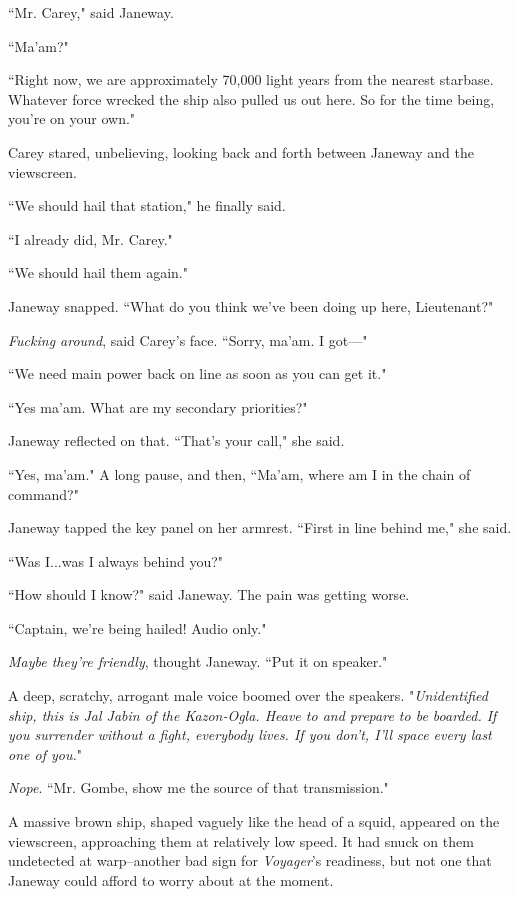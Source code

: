 \documentclass[twoside,letterpaper,12pt]{memoir}
\begin{document}
``Mr. Carey," said Janeway.

``Ma'am?"

``Right now, we are approximately 70,000 light years from the nearest starbase. Whatever force wrecked the ship also pulled us out here. So for the time being, you're on your own."

Carey stared, unbelieving, looking back and forth between Janeway and the viewscreen.

``We should hail that station," he finally said.

``I already did, Mr. Carey."

``We should hail them again."

Janeway snapped. ``What do you think we've been doing up here, Lieutenant?"

\textit{Fucking around}, said Carey's face. ``Sorry, ma'am. I got---"

``We need main power back on line as soon as you can get it."

``Yes ma'am. What are my secondary priorities?"

Janeway reflected on that. ``That's your call," she said.

``Yes, ma'am." A long pause, and then, ``Ma'am, where am I in the chain of command?"

Janeway tapped the key panel on her armrest. ``First in line behind me," she said.

``Was I...was I always behind you?"

``How should I know?" said Janeway. The pain was getting worse.

``Captain, we're being hailed! Audio only."

\textit{Maybe they're friendly}, thought Janeway. ``Put it on speaker."

A deep, scratchy, arrogant male voice boomed over the speakers. "\textit{Unidentified ship, this is Jal Jabin of the Kazon-Ogla. Heave to and prepare to be boarded. If you surrender without a fight, everybody lives. If you don't, I'll space every last one of you.}"

\textit{Nope}. ``Mr. Gombe, show me the source of that transmission."

A massive brown ship, shaped vaguely like the head of a squid, appeared on the viewscreen, approaching them at relatively low speed. It had snuck on them undetected at warp--another bad sign for \textit{Voyager}'s readiness, but not one that Janeway could afford to worry about at the moment.
\end{document}
